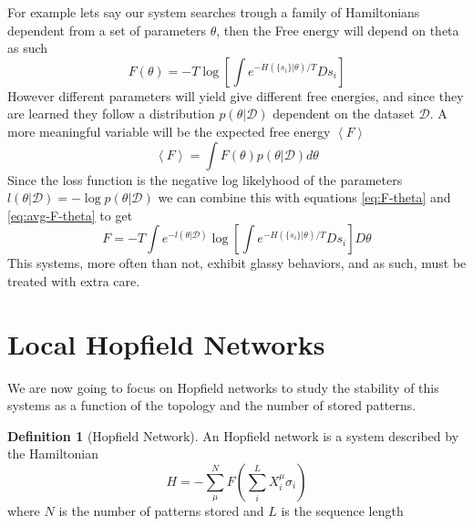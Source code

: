 \documentclass{article}
\theoremstyle{definition}
\newtheorem{definition}{Definition}[section]
\theoremstyle{remark}
\newcommand{\avg}[1]{\left \langle #1 \right \rangle}
\begin{document}
    For example lets say our system searches trough a family of Hamiltonians dependent from a set of parameters $\theta$, then the Free energy will depend on theta as such
    \begin{equation}
        \label{eq:F-theta}
        F(\theta)=-T\log\left[\int e^{-H(\{s_i\}|\theta)/T}Ds_i\right]
    \end{equation}
    However different parameters will yield give different free energies, and since they are learned they follow a distribution $p(\theta|\mathcal D)$ dependent on the dataset $\mathcal D$. A more meaningful variable will be the expected free energy $\avg{F}$
    \begin{equation}
        \label{eq:avg-F-theta}
        \avg F=\int F(\theta)p(\theta|\mathcal D)d\theta
    \end{equation}
    Since the loss function is the negative log likelyhood of the parameters $l(\theta|\mathcal D)=-\log p(\theta|\mathcal D)$ we can combine this with equations \ref{eq:F-theta} and \ref{eq:avg-F-theta} to get
    \begin{equation}
        F=-T\int e^{-l(\theta|\mathcal D)}\log\left[\int e^{-H(\{s_i\}|\theta)/T}Ds_i\right] D\theta
    \end{equation}
    This systems, more often than not, exhibit glassy behaviors, and as such, must be treated with extra care.


\section{Local Hopfield Networks}
    \label{sec:local-hop}
    We are now going to focus on Hopfield networks to study the stability of this systems as a function of the topology and the number of stored patterns.

    \begin{definition}[Hopfield Network]
        An Hopfield network is a system described by the Hamiltonian
        \begin{equation}
            H=-\sum_\mu^N F\left(\sum_i^LX^\mu_i \sigma_i\right)
        \end{equation}
        where $N$ is the number of patterns stored and $L$ is the sequence length
    \end{definition}
\end{document}
